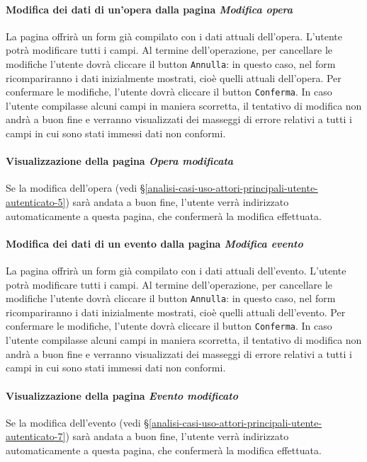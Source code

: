 \paragraph{Modifica dei dati di un'opera dalla pagina \textit{Modifica opera}}
\label{analisi-casi-uso-attori-principali-utente-amministratore-10}
La pagina offrirà un form già compilato con i dati attuali dell'opera. L'utente potrà modificare tutti i campi. Al termine dell'operazione, per cancellare le modifiche l'utente dovrà cliccare il button \texttt{Annulla}: in questo caso, nel form ricompariranno i dati inizialmente mostrati, cioè quelli attuali dell'opera. Per confermare le modifiche, l'utente dovrà cliccare il button \texttt{Conferma}. In caso l'utente compilasse alcuni campi in maniera scorretta, il tentativo di modifica non andrà a buon fine e verranno visualizzati dei masseggi di errore relativi a tutti i campi in cui sono stati immessi dati non conformi.


\paragraph{Visualizzazione della pagina \textit{Opera modificata}}
\label{analisi-casi-uso-attori-principali-utente-amministratore-11}
Se la modifica dell'opera (vedi §\ref{analisi-casi-uso-attori-principali-utente-autenticato-5}) sarà andata a buon fine, l'utente verrà indirizzato automaticamente a questa pagina, che confermerà la modifica effettuata.


\paragraph{Modifica dei dati di un evento dalla pagina \textit{Modifica evento}}
\label{analisi-casi-uso-attori-principali-utente-amministratore-12}
La pagina offrirà un form già compilato con i dati attuali dell'evento. L'utente potrà modificare tutti i campi. Al termine dell'operazione, per cancellare le modifiche l'utente dovrà cliccare il button \texttt{Annulla}: in questo caso, nel form ricompariranno i dati inizialmente mostrati, cioè quelli attuali dell'evento. Per confermare le modifiche, l'utente dovrà cliccare il button \texttt{Conferma}. In caso l'utente compilasse alcuni campi in maniera scorretta, il tentativo di modifica non andrà a buon fine e verranno visualizzati dei masseggi di errore relativi a tutti i campi in cui sono stati immessi dati non conformi.


\paragraph{Visualizzazione della pagina \textit{Evento modificato}}
\label{analisi-casi-uso-attori-principali-utente-amministratore-13}
Se la modifica dell'evento (vedi §\ref{analisi-casi-uso-attori-principali-utente-autenticato-7}) sarà andata a buon fine, l'utente verrà indirizzato automaticamente a questa pagina, che confermerà la modifica effettuata.


